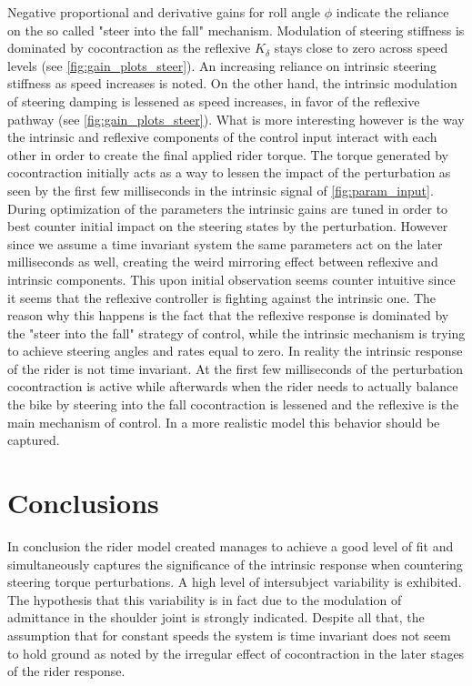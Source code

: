 Negative proportional and derivative gains for roll angle \ensuremath{\phi} indicate the reliance on the so called "steer into the fall" mechanism.   Modulation of steering stiffness is dominated by cocontraction as the reflexive \ensuremath{K_\delta} stays close to zero across speed levels (see \cref{fig:gain_plots_steer}). An increasing reliance on intrinsic steering stiffness as speed increases is noted. On the other hand, the intrinsic modulation of steering damping is lessened as speed increases, in favor of the reflexive pathway (see \cref{fig:gain_plots_steer}). What is more interesting however is the way the intrinsic and reflexive components of the control input interact with each other in order to create the final applied rider torque. The torque generated by cocontraction initially acts as a way to lessen the  impact of the perturbation as seen by the first few milliseconds in the intrinsic signal of \cref{fig:param_input}. During optimization of the parameters the intrinsic gains are tuned in order to best counter initial impact on the steering states by the perturbation. However since we assume a time invariant  system the same parameters act on the later milliseconds as well, creating the weird mirroring effect between reflexive and intrinsic components. This upon initial observation seems counter intuitive since it seems that the reflexive controller is fighting against the intrinsic one. The reason why this happens is the fact that the reflexive response is dominated by the "steer into the fall" strategy of control, while the intrinsic mechanism is trying to achieve  steering angles and rates equal to zero. In reality the intrinsic response of the rider is not time invariant. At the first few milliseconds of the perturbation cocontraction is active while afterwards when the rider needs to actually balance the bike by steering into the fall cocontraction is lessened and the reflexive is the main mechanism of control.  In a more realistic model this behavior should be captured.
\section{Conclusions}
In conclusion the rider model created manages to achieve a good level of fit and simultaneously captures the significance of the intrinsic response when countering steering torque perturbations. A high level of intersubject variability is exhibited. The hypothesis that this variability is in fact due to the modulation of admittance in the shoulder joint is strongly indicated. Despite all that,  the assumption that for constant speeds the system is time invariant does not seem to hold ground as noted by the irregular effect of cocontraction in the later stages of the rider  response.